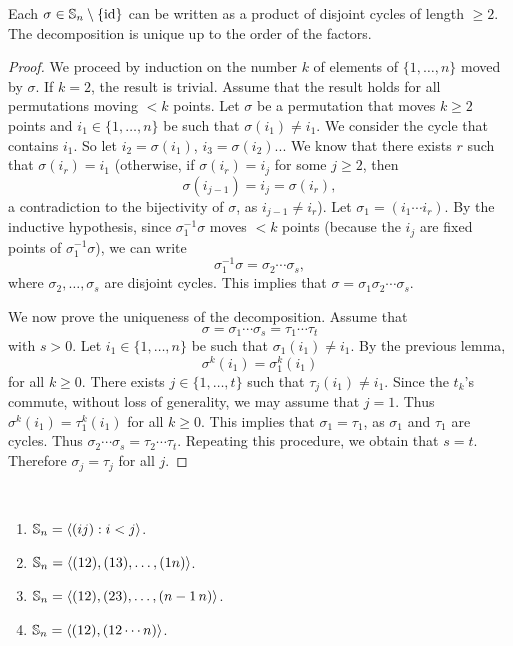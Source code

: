 \begin{theorem}
Each $\sigma\in\mathbb{S}_n\setminus\{\operatorname{id}\}$ can be written as a product
of disjoint cycles of length 
 $\geq2$. The decomposition is unique up to 
 the order of the factors. 
 \end{theorem}

\begin{proof}
    We proceed by induction on the number $k$ 
    of elements of $\{1,\dots,n\}$ moved by $\sigma$. If $k=2$, 
    the result is trivial. Assume that the result 
    holds for all permutations moving $<k$ points. Let
    $\sigma$ be a permutation that moves $k\geq2$ points and 
    $i_1\in\{1,\dots,n\}$ be such that $\sigma(i_1)\ne i_1$. We 
    consider the cycle that contains $i_1$. So let 
        $i_2=\sigma(i_1)$, $i_3=\sigma(i_2)$... We know that 
        there exists $r$ such that $\sigma(i_r)=i_1$
        (otherwise, if $\sigma(i_r)=i_j$ for some 
        $j\geq2$, then 
        \[
        \sigma(i_{j-1})=i_j=\sigma(i_r),
        \]
        a contradiction to the bijectivity of $\sigma$, as $i_{j-1}\ne i_r$). 
        Let $\sigma_1=(i_1\cdots i_r)$. By the inductive hypothesis, since 
        $\sigma_1^{-1}\sigma$ moves $<k$ points (because 
        the $i_j$ are fixed points of $\sigma_1^{-1}\sigma$), 
        we can write \[
        \sigma_1^{-1}\sigma=\sigma_2\cdots\sigma_s,
        \]
        where 
        $\sigma_2,\dots,\sigma_s$ are disjoint cycles. 
        This implies that $\sigma=\sigma_1\sigma_2\cdots\sigma_s$.

        We now prove the uniqueness of the decomposition. 
        Assume that 
        \[
        \sigma=\sigma_1\cdots\sigma_s=\tau_1\cdots\tau
_t
\]
with $s>0$. Let $i_1\in\{1,\dots,n\}$ be such that 
        $\sigma_1(i_1)\ne i_1$. By the previous lemma, 
        \[
        \sigma^k(i_1)=\sigma_1^k(i_1)
        \]
        for all $k\geq0$.
        There exists $j\in\{1,\dots,t\}$ such that 
        $\tau_j(i_1)\ne i_1$. Since the $t_k$'s commute, 
        without loss of generality, we may assume that $j=
1$. Thus $\sigma^k(i_1)=\tau_1^k(i_1)$ for all $k\geq0$.  
This implies that 
        $\sigma_1=\tau_1$, as $\sigma_1$ and $\tau_1$ are cycles. 
        Thus $\sigma_2\cdots\sigma_s=\tau_2\cdots\tau_t$. Repeating
        this procedure, we obtain that $s=t$. Therefore 
        $\sigma_j=\tau_j$ for all $j$.
\end{proof}

\begin{corollary}\
\label{cor:generation}
        \begin{enumerate}
                \item $\mathbb{S}_n=\langle (ij):i<j\rangle$.
                \item $\mathbb{S}_n=\langle (12),(13),\dots,(1n)\rangle$.
                \item $\mathbb{S}_n=\langle (12),(23),\dots,(n-1\,n)\rangle$.
                \item $\mathbb{S}_n=\langle (12),(12\cdots n)\rangle$.
        \end{enumerate}
\end{corollary}

